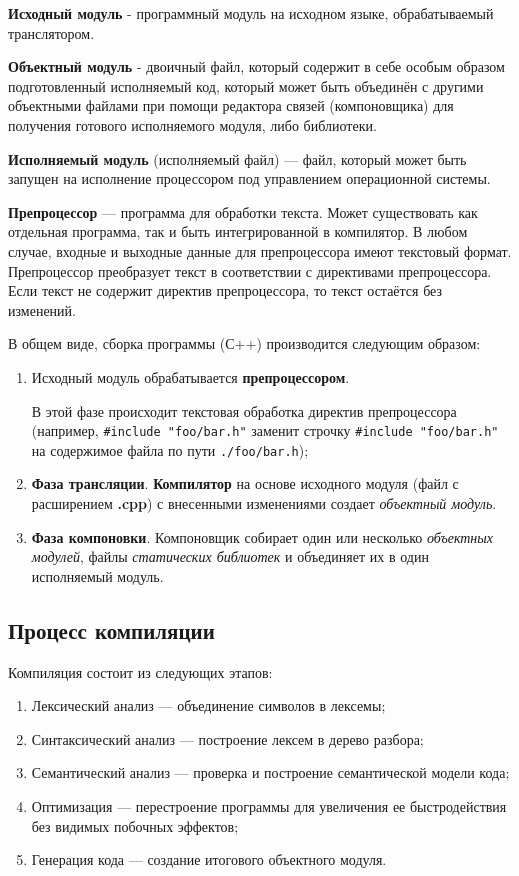 \textbf{Исходный модуль} - программный модуль на исходном языке,
обрабатываемый транслятором.

\textbf{Объектный модуль} - двоичный файл, который содержит в себе
особым образом подготовленный исполняемый код, который может быть
объединён с другими объектными файлами при помощи редактора связей
(компоновщика) для получения готового исполняемого модуля, либо
библиотеки.

\textbf{Исполняемый модуль} (исполняемый файл) --- файл, который может
быть запущен на исполнение процессором под управлением операционной
системы.

\textbf{Препроцессор} --- программа для обработки текста. Может
существовать как отдельная программа, так и быть интегрированной в
компилятор. В любом случае, входные и выходные данные для препроцессора
имеют текстовый формат. Препроцессор преобразует текст в соответствии с
директивами препроцессора. Если текст не содержит директив
препроцессора, то текст остаётся без изменений.

В общем виде, сборка программы (С++) производится следующим образом:

\begin{enumerate}
\def\labelenumi{\arabic{enumi})}
\item
  Исходный модуль обрабатывается \textbf{препроцессором}.

  В этой фазе происходит текстовая обработка директив препроцессора
  (например, \texttt{\#include\ "foo/bar.h"} заменит строчку
  \texttt{\#include\ "foo/bar.h"} на содержимое файла по пути
  \texttt{./foo/bar.h});
\item
  \textbf{Фаза трансляции}. \textbf{Компилятор} на основе исходного
  модуля (файл с расширением \textbf{.cpp}) с внесенными изменениями
  создает \emph{объектный модуль}.
\item
  \textbf{Фаза компоновки}. Компоновщик собирает один или несколько
  \emph{объектных модулей}, файлы \emph{статических библиотек} и
  объединяет их в один исполняемый модуль.
\end{enumerate}

\subsection{Процесс компиляции}

Компиляция состоит из следующих этапов:
\begin{enumerate}
  \item Лексический анализ --- объединение символов в лексемы;
  \item Синтаксический анализ --- построение лексем в дерево разбора;
  \item Семантический анализ --- проверка и построение семантической модели кода;
  \item Оптимизация --- перестроение программы для увеличения ее быстродействия без видимых побочных эффектов;
  \item Генерация кода --- создание итогового объектного модуля.
\end{enumerate}

